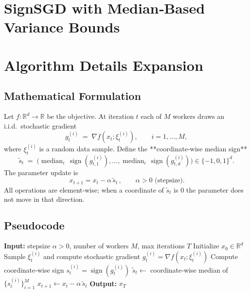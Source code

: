 \documentclass{article}
\newcommand{\sign}{\operatorname{sign}}
\newcommand{\R}{\mathbb{R}}
\begin{document}
\section*{SignSGD with Median‑Based Variance Bounds}

\section*{Algorithm Details Expansion}
\subsection*{Mathematical Formulation}
Let $f:\R^{d}\!\to\!\R$ be the objective.  
At iteration $t$ each of $M$ workers draws an i.i.d.\ stochastic gradient
\[
g^{(i)}_{t}\;=\;\nabla f(x_{t};\xi^{(i)}_{t}),\qquad i=1,\dots,M,
\]
where $\xi^{(i)}_{t}$ is a random data sample.  
Define the **coordinate‑wise median sign**
\[
\tilde{s}_{t}\;=\;\big(\operatorname{median}_{i}\,\sign(g^{(i)}_{t,1}),\dots,
\operatorname{median}_{i}\,\sign(g^{(i)}_{t,d})\big)\in\{-1,0,1\}^{d}.
\]
The parameter update is
\begin{equation}
\boxed{\,x_{t+1}=x_{t}-\alpha\,\tilde{s}_{t}\,},\qquad \alpha>0 \text{ (stepsize)}.
\label{eq:update}
\end{equation}
All operations are element‑wise; when a coordinate of $\tilde{s}_{t}$ is $0$ the
parameter does not move in that direction.

\subsection*{Pseudocode}
\begin{algorithm}[H]
\caption{SignSGD with Median Aggregation}
\begin{algorithmic}[1]
\State \textbf{Input:} stepsize $\alpha>0$, number of workers $M$, max iterations $T$
\State Initialize $x_{0}\in\R^{d}$
        \State Sample $\xi^{(i)}_{t}$ and compute stochastic gradient $g^{(i)}_{t}
                =\nabla f(x_{t};\xi^{(i)}_{t})$
        \State Compute coordinate‑wise sign $s^{(i)}_{t}= \sign(g^{(i)}_{t})$
    \EndFor
    \State $\tilde{s}_{t}\gets$ coordinate‑wise median of $\{s^{(i)}_{t}\}_{i=1}^{M}$
    \State $x_{t+1}\gets x_{t}-\alpha\,\tilde{s}_{t}$ 
\EndFor
\State \textbf{Output:} $x_{T}$
\end{algorithmic}
\end{algorithm}
\end{document}
